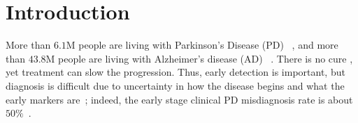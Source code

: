 \section{Introduction} 
%
%

\noindent More than $6.1$M people are living with Parkinson's Disease (PD) ~\cite{rocca2018burden}, and more than $43.8$M people are living with Alzheimer’s disease (AD) ~\cite{nichols2019global}.
There is no
cure
\cite{heemels2016neurodegenerative}, yet treatment can slow the progression. Thus, early detection is important, 
but diagnosis is
difficult due to uncertainty in how the disease begins and what the early markers are~\cite{poewe2017parkinson}; indeed, the early stage clinical PD misdiagnosis rate is about $50\%$~\cite{mollenhauer2017depressed}.


